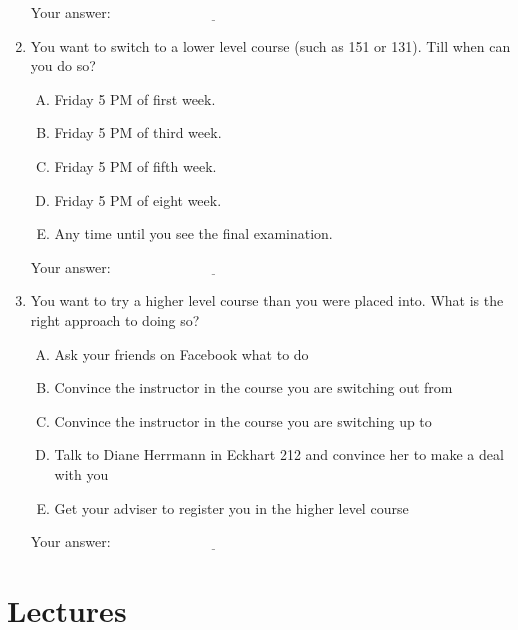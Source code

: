\documentclass[10pt]{amsart}
\begin{document}
\begin{enumerate}
  \vspace{0.1in}
  Your answer: $\underline{\qquad\qquad\qquad\qquad\qquad\qquad\qquad}$
  \vspace{0.1in}

\item You want to switch to a lower level course (such as 151 or
  131). Till when can you do so?

  \begin{enumerate}[(A)]
  \item Friday 5 PM of first week.
  \item Friday 5 PM of third week.
  \item Friday 5 PM of fifth week.
  \item Friday 5 PM of eight week.
  \item Any time until you see the final examination.
  \end{enumerate}

  \vspace{0.1in}
  Your answer: $\underline{\qquad\qquad\qquad\qquad\qquad\qquad\qquad}$
  \vspace{0.1in}

\item You want to try a higher level course than you were placed
  into. What is the right approach to doing so?

  \begin{enumerate}[(A)]
  \item Ask your friends on Facebook what to do
  \item Convince the instructor in the course you are switching out from
  \item Convince the instructor in the course you are switching up to
  \item Talk to Diane Herrmann in Eckhart 212 and convince her to make
    a deal with you
  \item Get your adviser to register you in the higher level course
  \end{enumerate}

  \vspace{0.1in}
  Your answer: $\underline{\qquad\qquad\qquad\qquad\qquad\qquad\qquad}$
  \vspace{0.1in}

\end{enumerate}

\section{Lectures}
\end{document}
